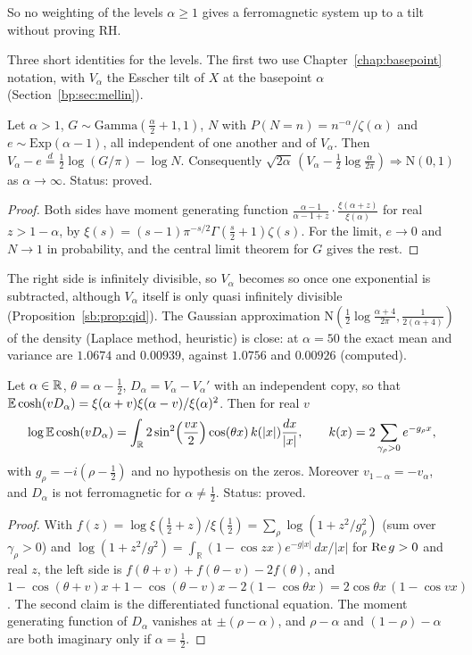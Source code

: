 So no weighting of the levels $\alpha\ge1$ gives a ferromagnetic system up to a tilt without proving RH.

Three short identities for the levels. The first two use Chapter~\ref{chap:basepoint} notation, with $V_\alpha$ the Esscher tilt of $X$ at the basepoint $\alpha$ (Section~\ref{bp:sec:mellin}).

\begin{proposition}\label{fm:prop:vminuse}
Let $\alpha>1$, $G\sim\mathrm{Gamma}(\frac\alpha2+1,1)$, $N$ with $P(N=n)=n^{-\alpha}/\zeta(\alpha)$ and $e\sim\mathrm{Exp}(\alpha-1)$, all independent of one another and of $V_\alpha$. Then $V_\alpha-e\overset d=\frac12\log(G/\pi)-\log N$. Consequently $\sqrt{2\alpha}\,(V_\alpha-\frac12\log\frac\alpha{2\pi})\Rightarrow\mathrm N(0,1)$ as $\alpha\to\infty$. Status: proved.
\end{proposition}

\begin{proof}
Both sides have moment generating function $\frac{\alpha-1}{\alpha-1+z}\cdot\frac{\xi(\alpha+z)}{\xi(\alpha)}$ for real $z>1-\alpha$, by $\xi(s)=(s-1)\pi^{-s/2}\Gamma(\frac s2+1)\zeta(s)$. For the limit, $e\to0$ and $N\to1$ in probability, and the central limit theorem for $G$ gives the rest.
\end{proof}

The right side is infinitely divisible, so $V_\alpha$ becomes so once one exponential is subtracted, although $V_\alpha$ itself is only quasi infinitely divisible (Proposition~\ref{sb:prop:qid}). The Gaussian approximation $\mathrm N(\frac12\log\frac{\alpha+4}{2\pi},\frac1{2(\alpha+4)})$ of the density (Laplace method, heuristic) is close: at $\alpha=50$ the exact mean and variance are $1.0674$ and $0.00939$, against $1.0756$ and $0.00926$ (computed).

\begin{proposition}\label{fm:prop:modul}
Let $\alpha\in\mathbb{R}$, $\theta=\alpha-\frac12$, $D_\alpha=V_\alpha-V_\alpha'$ with an independent copy, so that $\mathbb{E}\cosh(vD_\alpha)=\xi(\alpha+v)\xi(\alpha-v)/\xi(\alpha)^2$. Then for real $v$
\[
\log\mathbb{E}\cosh(vD_\alpha)=\int_{\mathbb R}2\sin^2\Bigl(\frac{vx}2\Bigr)\cos(\theta x)\,k(|x|)\frac{dx}{|x|},\qquad k(x)=2\sum_{\gamma_\rho>0}e^{-g_\rho x},
\]
with $g_\rho=-i(\rho-\frac12)$ and no hypothesis on the zeros. Moreover $v_{1-\alpha}=-v_\alpha$, and $D_\alpha$ is not ferromagnetic for $\alpha\ne\frac12$. Status: proved.
\end{proposition}

\begin{proof}
With $f(z)=\log\xi(\frac12+z)/\xi(\frac12)=\sum_\rho\log(1+z^2/g_\rho^2)$ (sum over $\gamma_\rho>0$) and $\log(1+z^2/g^2)=\int_{\mathbb R}(1-\cos zx)e^{-g|x|}\,dx/|x|$ for $\operatorname{Re} g>0$ and real $z$, the left side is $f(\theta+v)+f(\theta-v)-2f(\theta)$, and $1-\cos(\theta+v)x+1-\cos(\theta-v)x-2(1-\cos\theta x)=2\cos\theta x\,(1-\cos vx)$. The second claim is the differentiated functional equation. The moment generating function of $D_\alpha$ vanishes at $\pm(\rho-\alpha)$, and $\rho-\alpha$ and $(1-\rho)-\alpha$ are both imaginary only if $\alpha=\frac12$.
\end{proof}

